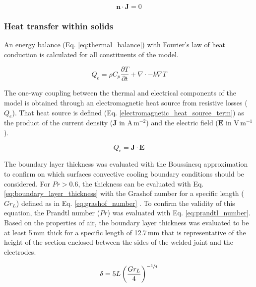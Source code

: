 \begin{equation}
\mathbf{n} \cdot \mathbf{J} = 0
\label{electrical_insulation}
\end{equation}

\subsubsection{Heat transfer within solids}

An energy balance (Eq. \ref{eq:thermal_balance}) with Fourier’s law of heat conduction is calculated for all constituents of the model. 

\begin{equation}
Q_e= \rho C_p \frac{\partial T}{\partial t} + \nabla \cdot -k \nabla T
\label{eq:thermal_balance}
\end{equation}

The one-way coupling between the thermal and electrical components of the model is obtained through an electromagnetic heat source from resistive losses ($Q_e$).  
That heat source is defined (Eq. \ref{electromagnetic_heat_source_term}) as the product of the current density ($\mathbf{J}$ in \mbox{A\,m$^{-2}$}) and the electric field ($\mathbf{E}$ in \mbox{V\,m$^{-1}$}). 

\begin{equation}
Q_e =  \mathbf{J} \cdot \mathbf{E} 
\label{electromagnetic_heat_source_term}
\end{equation}

The boundary layer thickness was evaluated with the Boussinesq approximation to confirm on which surfaces convective cooling boundary conditions should be considered. 
For $Pr > 0.6 $, the thickness can be evaluated with Eq. \ref{eq:boundary_layer_thickness} with the Grashof number for a specific length ($Gr_L$) defined as in Eq. \ref{eq:grashof_number} \cite{Incropera2007}. 
To confirm the validity of this equation, the Prandtl number ($Pr$) was evaluated with Eq. \ref{eq:prandtl_number}. 
Based on the properties of air, the boundary layer thickness was evaluated to be at least \mbox{5\,mm} thick for a specific length of \mbox{12.7\,mm} that is representative of the height of the section enclosed between the sides of the welded joint and the electrodes. 

\begin{equation}
\delta = 5 L \left( \frac{Gr_L}{4} \right)^{-\sfrac{1}{4} }
\label{eq:boundary_layer_thickness}
\end{equation}

